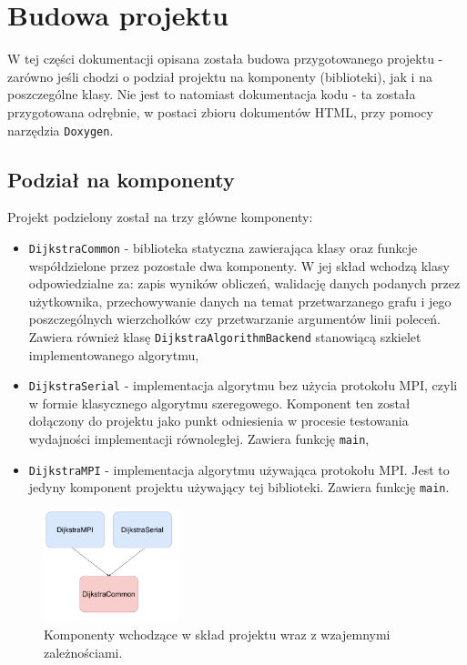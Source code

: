 \documentclass[12pt]{article}
\begin{document}
\newpage
\section{Budowa projektu}
W tej części dokumentacji opisana została budowa przygotowanego projektu - zarówno jeśli chodzi o podział projektu na komponenty (biblioteki), jak i na poszczególne klasy. Nie jest to natomiast dokumentacja kodu - ta została przygotowana odrębnie, w postaci zbioru dokumentów HTML, przy pomocy narzędzia \lstinline{Doxygen}.

\subsection{Podział na komponenty}
Projekt podzielony został na trzy główne komponenty:
\begin{itemize}
\item \lstinline{DijkstraCommon} - biblioteka statyczna zawierająca klasy oraz funkcje współdzielone przez pozostałe dwa komponenty. W jej skład wchodzą klasy odpowiedzialne za: zapis wyników obliczeń, walidację danych podanych przez użytkownika, przechowywanie danych na temat przetwarzanego grafu i jego poszczególnych wierzchołków czy przetwarzanie argumentów linii poleceń. Zawiera również klasę \lstinline{DijkstraAlgorithmBackend} stanowiącą szkielet implementowanego algorytmu,
\item \lstinline{DijkstraSerial} - implementacja algorytmu bez użycia protokołu MPI, czyli w formie klasycznego algorytmu szeregowego. Komponent ten został dołączony do projektu jako punkt odniesienia w procesie testowania wydajności implementacji równoległej. Zawiera funkcję \lstinline{main},
\item \lstinline{DijkstraMPI} - implementacja algorytmu używająca protokołu MPI. Jest to jedyny komponent projektu używający tej biblioteki. Zawiera funkcję \lstinline{main}.
\end{itemize}
\begin{figure}[H]
\centering
\includegraphics[width=0.35\textwidth]{static/DijkstraArch1.pdf}
\caption{Komponenty wchodzące w skład projektu wraz z wzajemnymi zależnościami.}
\label{fig:arch1}
\end{figure}
\end{document}
